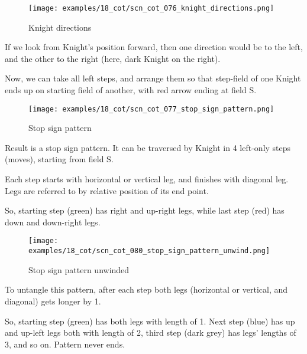 \noindent
\begin{wrapfigure}[10]{l}{0.4\textwidth}
\centering
\texttt{[image: examples/18\_cot/scn\_cot\_076\_knight\_directions.png]}
\vspace*{-0.4\baselineskip}
\caption{Knight directions}
\label{fig:scn_cot_076_knight_directions}
\end{wrapfigure}
If we look from Knight's position forward, then one direction would be to
the left, and the other to the right (here, dark Knight on the right).

Now, we can take all left steps, and arrange them so that step-field of one
Knight ends up on starting field of another, with red arrow ending at field S.


\vspace*{3.7\baselineskip}
\noindent
\begin{wrapfigure}[12]{l}{0.4\textwidth}
\centering
\texttt{[image: examples/18\_cot/scn\_cot\_077\_stop\_sign\_pattern.png]}
\vspace*{-0.4\baselineskip}
\caption{Stop sign pattern}
\label{fig:scn_cot_077_stop_sign_pattern}
\end{wrapfigure}
Result is a stop sign pattern. It can be traversed by Knight in 4 left-only
steps (moves), starting from field S.

Each step starts with horizontal or vertical leg, and finishes with diagonal
leg. Legs are referred to by relative position of its end point.

So, starting step (green) has right and up-right legs, while last step (red)
has down and down-right legs.

\clearpage %

\noindent
\begin{wrapfigure}{l}{0.4\textwidth} %
\centering
\texttt{[image: examples/18\_cot/scn\_cot\_080\_stop\_sign\_pattern\_unwind.png]}
\caption{Stop sign pattern unwinded}
\label{fig:scn_cot_080_stop_sign_pattern_unwind}
\end{wrapfigure}
To untangle this pattern, after each step both legs (horizontal or vertical,
and diagonal) gets longer by 1.

So, starting step (green) has both legs with length of 1. Next step (blue)
has up and up-left legs both with length of 2, third step (dark grey) has
legs' lengths of 3, and so on. Pattern never ends.

